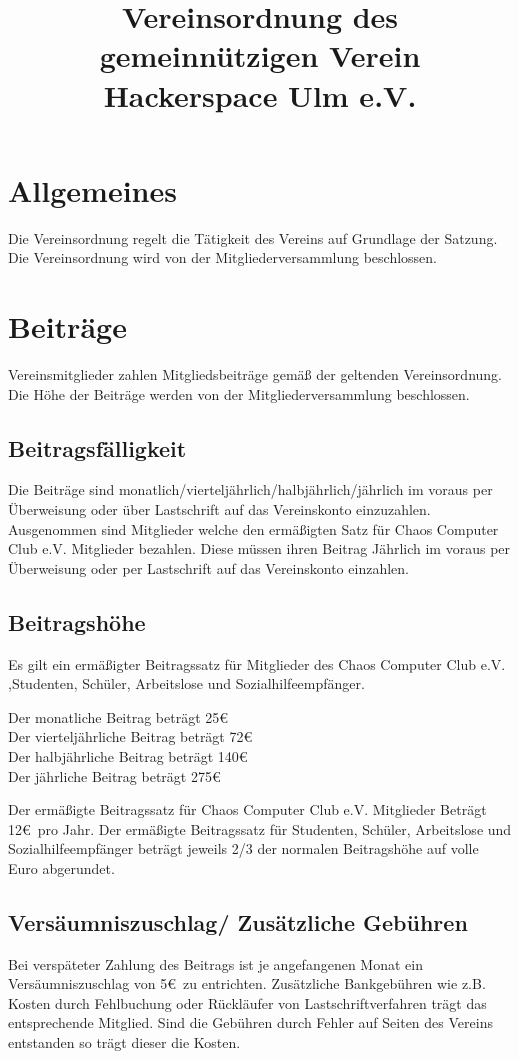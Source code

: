 \documentclass[a4paper, 12pt]{scrartcl}
\title{Vereinsordnung des gemeinnützigen Verein Hackerspace Ulm e.V. }
\author{}
\date{}
\begin{document}
\maketitle
\sffamily

\section{Allgemeines}
Die Vereinsordnung regelt die Tätigkeit des Vereins auf Grundlage der Satzung. Die Vereinsordnung wird von der Mitgliederversammlung beschlossen. 
\section{Beiträge}
Vereinsmitglieder zahlen Mitgliedsbeiträge gemäß der geltenden Vereinsordnung. Die Höhe der Beiträge werden von der Mitgliederversammlung beschlossen. 
\subsection{Beitragsfälligkeit}
Die Beiträge sind monatlich/vierteljährlich/halbjährlich/jährlich im voraus per Überweisung oder über Lastschrift auf das Vereinskonto einzuzahlen.
Ausgenommen sind Mitglieder welche den ermäßigten Satz für Chaos Computer Club e.V. Mitglieder bezahlen. Diese müssen ihren Beitrag Jährlich im voraus per Überweisung
oder per Lastschrift auf das Vereinskonto einzahlen.
\subsection{Beitragshöhe}

Es gilt ein ermäßigter Beitragssatz für Mitglieder des Chaos Computer Club e.V. ,Studenten, Schüler, Arbeitslose und Sozialhilfeempfänger. 
\begin{addmargin}[0.25in]{0cm}
Der monatliche Beitrag beträgt 25\euro{}\\
Der vierteljährliche Beitrag beträgt 72\euro{}\\
Der halbjährliche Beitrag beträgt 140\euro{} \\
Der jährliche Beitrag beträgt 275\euro{}
\end{addmargin}
Der ermäßigte Beitragssatz für Chaos Computer Club e.V. Mitglieder Beträgt 12\euro \  pro Jahr. 
\newline
Der ermäßigte Beitragssatz für Studenten, Schüler, Arbeitslose und Sozialhilfeempfänger beträgt jeweils 2/3 der normalen Beitragshöhe auf volle Euro abgerundet.
\subsection{Versäumniszuschlag/ Zusätzliche Gebühren}
Bei verspäteter Zahlung des Beitrags ist je angefangenen Monat ein Versäumniszuschlag von 5\euro \ zu entrichten. Zusätzliche Bankgebühren wie z.B. Kosten durch Fehlbuchung oder Rückläufer von Lastschriftverfahren trägt das entsprechende Mitglied. Sind die Gebühren durch Fehler auf Seiten des Vereins entstanden so trägt dieser die Kosten. 
\end{document}
